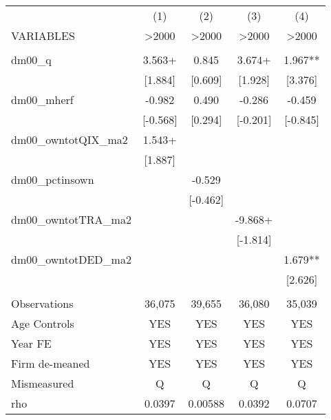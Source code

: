 \documentclass[]{article}
\begin{document}
\begin{tabular}{lcccc} \hline
 & (1) & (2) & (3) & (4) \\
VARIABLES & >2000 & >2000 & >2000 & >2000 \\ \hline
 &  &  &  &  \\
dm00\_q & 3.563+ & 0.845 & 3.674+ & 1.967** \\
 & [1.884] & [0.609] & [1.928] & [3.376] \\
dm00\_mherf & -0.982 & 0.490 & -0.286 & -0.459 \\
 & [-0.568] & [0.294] & [-0.201] & [-0.845] \\
dm00\_owntotQIX\_ma2 & 1.543+ &  &  &  \\
 & [1.887] &  &  &  \\
dm00\_pctinsown &  & -0.529 &  &  \\
 &  & [-0.462] &  &  \\
dm00\_owntotTRA\_ma2 &  &  & -9.868+ &  \\
 &  &  & [-1.814] &  \\
dm00\_owntotDED\_ma2 &  &  &  & 1.679** \\
 &  &  &  & [2.626] \\
 &  &  &  &  \\
Observations & 36,075 & 39,655 & 36,080 & 35,039 \\
Age Controls & YES & YES & YES & YES \\
Year FE & YES & YES & YES & YES \\
Firm de-meaned & YES & YES & YES & YES \\
Mismeasured & Q & Q & Q & Q \\
 rho & 0.0397 & 0.00588 & 0.0392 & 0.0707 \\ \hline
\end{tabular}
\end{document}
